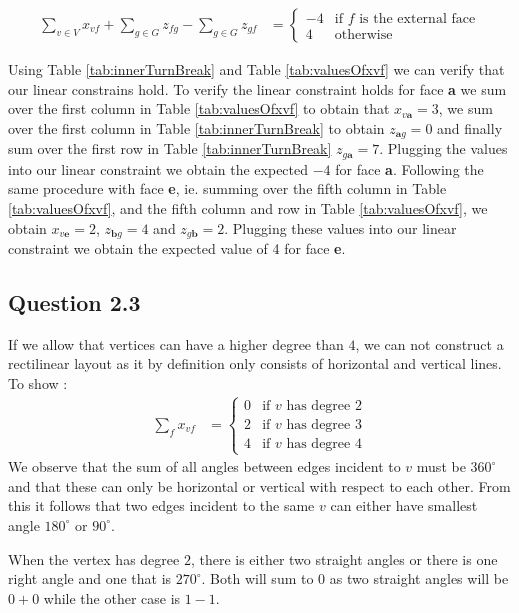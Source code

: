\documentclass[a4paper]{article}
\begin{document}
\begin{align*}
\sum_{v\in V} x_{vf}+\sum_{g\in G} z_{fg}-\sum_{g\in G} z_{gf} &=
\begin{cases}
-4 & \text{if $f$ is the external face} \\
4  & \text{otherwise}
\end{cases}
\end{align*}

Using Table \ref{tab:innerTurnBreak} and Table \ref{tab:valuesOfxvf} we can verify that our linear constrains hold. To verify the linear constraint holds for face \textbf{a} we sum over the first column in Table \ref{tab:valuesOfxvf} to obtain that \(x_{v\textbf{a}}=3\), we sum over the first column in Table \ref{tab:innerTurnBreak} to obtain \(z_{\textbf{a}g} = 0\) and finally sum over the first row in Table \ref{tab:innerTurnBreak} \(z_{g\textbf{a}} = 7\). Plugging the values into our linear constraint we obtain the expected \(-4\) for face \textbf{a}. Following the same procedure with face \textbf{e}, ie. summing over the fifth column in Table \ref{tab:valuesOfxvf}, and the fifth column and row in Table \ref{tab:valuesOfxvf}, we obtain \(x_{v\textbf{e}}=2\), \(z_{\textbf{b}g} = 4\) and \(z_{g\textbf{b}} = 2\). Plugging these values into our linear constraint we obtain the expected value of 4 for face \textbf{e}.

\subsection*{Question 2.3}
If we allow that vertices can have a higher degree than $4$, we can not construct a rectilinear layout as it by definition only consists of horizontal and vertical lines. \\
To show :
\begin{align*}
\sum_{f} x_{vf} &=
\begin{cases}
0 & \text{if $v$ has degree 2} \\
2 & \text{if $v$ has degree 3} \\
4 & \text{if $v$ has degree 4}
\end{cases}
\end{align*}
We observe that the sum of all angles between edges incident to \(v\) must be \(360^\circ\) and that these can only be horizontal or vertical with respect to each other. From this it follows that two edges incident to the same \(v\) can either have smallest angle \(180^\circ\) or \(90^\circ\).

When the vertex has degree $2$, there is either two straight angles or there is one right angle and one that is $270^{\circ}$. Both will sum to $0$ as two straight angles will be $0+0$ while the other case is $1-1$.
\end{document}
